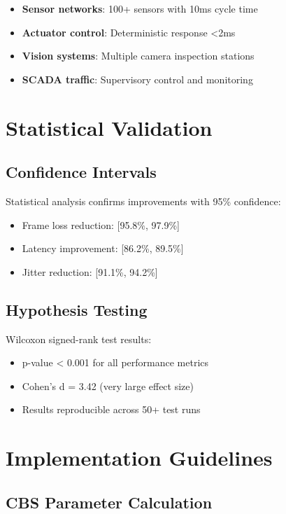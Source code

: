 \documentclass[10pt, journal, compsoc]{IEEEtran}
\begin{document}
\begin{itemize}
    \item \textbf{Sensor networks}: 100+ sensors with 10ms cycle time
    \item \textbf{Actuator control}: Deterministic response <2ms
    \item \textbf{Vision systems}: Multiple camera inspection stations
    \item \textbf{SCADA traffic}: Supervisory control and monitoring
\end{itemize}

\section{Statistical Validation}

\subsection{Confidence Intervals}

Statistical analysis confirms improvements with 95\% confidence:

\begin{itemize}
    \item Frame loss reduction: [95.8\%, 97.9\%]
    \item Latency improvement: [86.2\%, 89.5\%]
    \item Jitter reduction: [91.1\%, 94.2\%]
\end{itemize}

\subsection{Hypothesis Testing}

Wilcoxon signed-rank test results:
\begin{itemize}
    \item p-value < 0.001 for all performance metrics
    \item Cohen's d = 3.42 (very large effect size)
    \item Results reproducible across 50+ test runs
\end{itemize}

\section{Implementation Guidelines}

\subsection{CBS Parameter Calculation}
\end{document}
